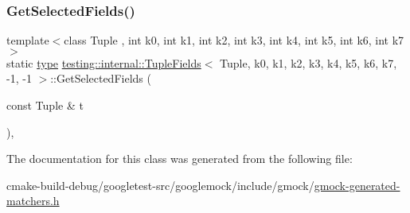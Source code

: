\subsubsection{\texorpdfstring{GetSelectedFields()}{GetSelectedFields()}}
{\footnotesize\ttfamily template$<$class Tuple , int k0, int k1, int k2, int k3, int k4, int k5, int k6, int k7$>$ \\
static \mbox{\hyperlink{classtesting_1_1internal_1_1TupleFields_3_01Tuple_00_01k0_00_01k1_00_01k2_00_01k3_00_01k4_00_01kb66bdb5aa3faae197a495470a1b8e9d1_a4ca1e3e9805d5f38ac371529b67496d2}{type}} \mbox{\hyperlink{classtesting_1_1internal_1_1TupleFields}{testing\+::internal\+::\+Tuple\+Fields}}$<$ Tuple, k0, k1, k2, k3, k4, k5, k6, k7, -\/1, -\/1 $>$\+::Get\+Selected\+Fields (\begin{DoxyParamCaption}\item[{const Tuple \&}]{t }\end{DoxyParamCaption})\hspace{0.3cm}{\ttfamily [inline]}, {\ttfamily [static]}}



The documentation for this class was generated from the following file\+:\begin{DoxyCompactItemize}
\item 
cmake-\/build-\/debug/googletest-\/src/googlemock/include/gmock/\mbox{\hyperlink{gmock-generated-matchers_8h}{gmock-\/generated-\/matchers.\+h}}\end{DoxyCompactItemize}
